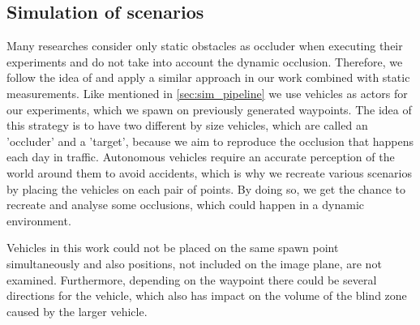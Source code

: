 \subsection{Simulation of scenarios} \label{sec:sim_stage}
Many researches consider only static obstacles as occluder when executing their experiments and do not take into account the dynamic occlusion. Therefore, we follow the idea of \cite{occlusion_degree_model} and apply a similar approach in our work combined with static measurements. Like mentioned in \ref{sec:sim_pipeline} we use vehicles as actors for our experiments, which we spawn on previously generated waypoints. The idea of this strategy is to have two different by size vehicles, which are called an 'occluder' and a 'target', because we aim to reproduce the occlusion that happens each day in traffic. Autonomous vehicles require an accurate perception of the world around them to avoid accidents, which is why we recreate various scenarios by placing the vehicles on each pair of points. By doing so, we get the chance to recreate and analyse some occlusions, which could happen in a dynamic environment.

Vehicles in this work could not be placed on the same spawn point simultaneously and also positions, not included on the image plane, are not examined. Furthermore, depending on the waypoint there could be several directions for the vehicle, which also has impact on the volume of the blind zone caused by the larger vehicle. 

